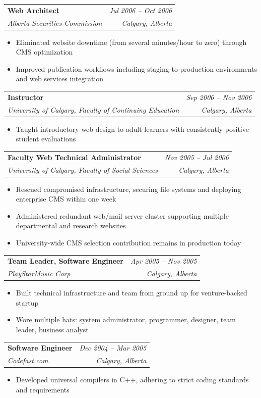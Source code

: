 \documentclass[11pt]{article}
\makeatletter
\newcommand{\experience}[4]{
  \vspace{4pt}
  \begin{tabular*}{\textwidth}{@{}l@{\extracolsep{\fill}}r@{}}
    \textbf{#1} & \textit{#2} \\
    \textit{\small#3} & \textit{\small#4}
  \end{tabular*}
  \vspace{-4pt}
}
\makeatother
\begin{document}
\experience{Web Architect}{Jul 2006 -- Oct 2006}{Alberta Securities Commission}{Calgary, Alberta}
\begin{itemize}
    \item Eliminated website downtime (from several minutes/hour to zero) through CMS optimization
    \item Improved publication workflows including staging-to-production environments and web services integration
\end{itemize}

\experience{Instructor}{Sep 2006 -- Nov 2006}{University of Calgary, Faculty of Continuing Education}{Calgary, Alberta}
\begin{itemize}
    \item Taught introductory web design to adult learners with consistently positive student evaluations
\end{itemize}

\experience{Faculty Web Technical Administrator}{Nov 2005 -- Jul 2006}{University of Calgary, Faculty of Social Sciences}{Calgary, Alberta}
\begin{itemize}
    \item Rescued compromised infrastructure, securing file systems and deploying enterprise CMS within one week
    \item Administered redundant web/mail server cluster supporting multiple departmental and research websites
    \item University-wide CMS selection contribution remains in production today
\end{itemize}

\experience{Team Leader, Software Engineer}{Apr 2005 -- Nov 2005}{PlayStarMusic Corp}{Calgary, Alberta}
\begin{itemize}
    \item Built technical infrastructure and team from ground up for venture-backed startup
    \item Wore multiple hats: system administrator, programmer, designer, team leader, business analyst
\end{itemize}

\experience{Software Engineer}{Dec 2004 -- Mar 2005}{Codefast.com}{Calgary, Alberta}
\begin{itemize}
    \item Developed universal compilers in C++, adhering to strict coding standards and requirements
\end{itemize}

\end{document}
